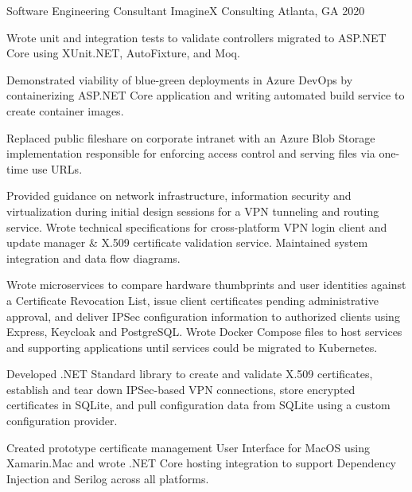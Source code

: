 

\begin{cventries}

  \cventry
    {Software Engineering Consultant} %
    {ImagineX Consulting} %
    {Atlanta, GA} %
    {2020} %
    {
      \begin{cvitems} %
        \item {Wrote unit and integration tests to validate controllers migrated to ASP.NET Core using XUnit.NET, AutoFixture, and Moq.}
        \item {Demonstrated viability of blue-green deployments in Azure DevOps by containerizing ASP.NET Core application and writing automated build service to create container images.}
        \item {Replaced public fileshare on corporate intranet with an Azure Blob Storage implementation responsible for enforcing access control and serving files via one-time use URLs.}
        \item {Provided guidance on network infrastructure, information security and virtualization during initial design sessions for a VPN tunneling and routing service. Wrote technical specifications for cross-platform VPN login client and update manager \& X.509 certificate validation service. Maintained system integration and data flow diagrams.}
        \item {Wrote microservices to compare hardware thumbprints and user identities against a Certificate Revocation List, issue client certificates pending administrative approval, and deliver IPSec configuration information to authorized clients using Express, Keycloak and PostgreSQL. Wrote Docker Compose files to host services and supporting applications until services could be migrated to Kubernetes.}
        \item {Developed .NET Standard library to create and validate X.509 certificates, establish and tear down IPSec-based VPN connections, store encrypted certificates in SQLite, and pull configuration data from SQLite using a custom configuration provider.}
        \item {Created prototype certificate management User Interface for MacOS using Xamarin.Mac and wrote .NET Core hosting integration to support Dependency Injection and Serilog across all platforms.}
      \end{cvitems}
    }


\end{cventries}
